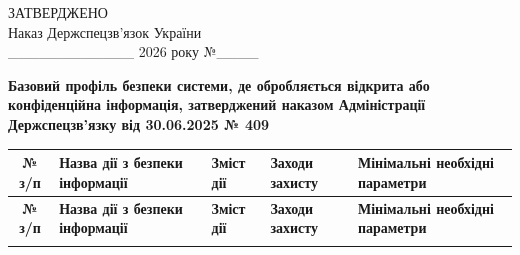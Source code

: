 \documentclass[10pt]{article}
\begin{document}
\begin{flushright}
ЗАТВЕРДЖЕНО\\
Наказ Держспецзв’язок України\\
\_\_\_\_\_\_\_\_\_\_\_\_ 2026 року №\_\_\_\_
\end{flushright}

\begin{center}
\textbf{\large Базовий профіль безпеки системи, де обробляється відкрита або конфіденційна інформація, затверджений наказом Адміністрації Держспецзв’язку від 30.06.2025 № 409}
\end{center}

\footnotesize
\begin{longtable}{|c|>{\raggedright\arraybackslash}p{4cm}|>{\raggedright\arraybackslash}p{6cm}|>{\raggedright\arraybackslash}p{2cm}|>{\raggedright\arraybackslash}p{4cm}|}
\hline
\textbf{№ з/п} & \textbf{Назва дії з безпеки інформації} & \textbf{Зміст дії} & \textbf{Заходи захисту} & \textbf{Мінімальні необхідні параметри}\\
\hline
\endfirsthead

\hline
\textbf{№ з/п} & \textbf{Назва дії з безпеки інформації} & \textbf{Зміст дії} & \textbf{Заходи захисту} & \textbf{Мінімальні необхідні параметри}\\
\hline
\endhead

\hline
\endfoot

\hline
\endlastfoot


\end{longtable}
\end{document}
